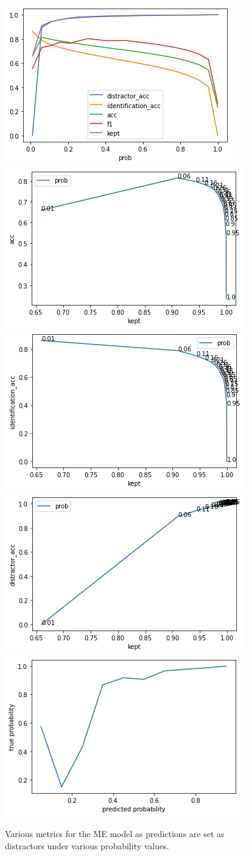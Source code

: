 \begin{figure}
    \centering
    \includegraphics[width=0.45\columnwidth]{50-files/me-all.png}
    \includegraphics[width=0.45\columnwidth]{50-files/me-acc-kept.png}
    \includegraphics[width=0.45\columnwidth]{50-files/me-id-kept.png}
    \includegraphics[width=0.45\columnwidth]{50-files/me-distr-kept.png}
    \includegraphics[width=0.45\columnwidth]{50-files/me-calibration.png}
    \caption{Various metrics for the ME model as predictions are set as distractors under various probability values.}
    \label{fig:me-plots}
\end{figure}

